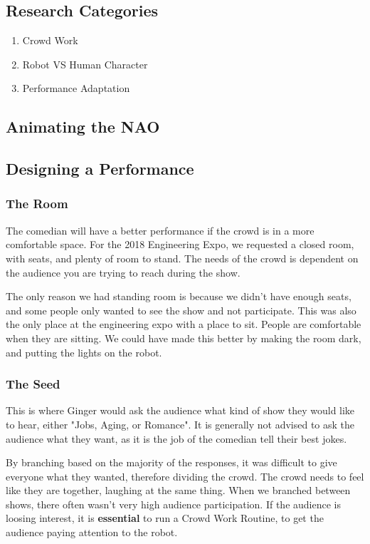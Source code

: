 \documentclass[onecolumn, draftclsnofoot,10pt, compsoc]{IEEEtran}
\begin{document}
\subsection{Research Categories}

		\begin{enumerate}
			\item Crowd Work
			\item Robot VS Human Character
			\item Performance Adaptation
		\end{enumerate}

\subsection{Animating the NAO}
\subsection{Designing a Performance}
    
    \subsubsection{The Room}
    The comedian will have a better performance if the crowd is in a more comfortable space.
    For the 2018 Engineering Expo, we requested a closed room, with seats, and plenty of room to stand.
    The needs of the crowd is dependent on the audience you are trying to reach during the show.


    The only reason we had standing room is because we didn't have enough seats, and some people only wanted to see the show and not participate.
    This was also the only place at the engineering expo with a place to sit.
    People are comfortable when they are sitting.
    We could have made this better by making the room dark, and putting the lights on the robot.
    \subsubsection{The Seed}
    This is where Ginger would ask the audience what kind of show they would like to hear, either "Jobs, Aging, or Romance".
    It is generally not advised to ask the audience what they want, as it is the job of the comedian tell their best jokes.


    By branching based on the majority of the responses, it was difficult to give everyone what they wanted, therefore dividing the crowd.
    The crowd needs to feel like they are together, laughing at the same thing.
    When we branched between shows, there often wasn't very high audience participation. 
    If the audience is loosing interest, it is \textbf{essential} to run a Crowd Work Routine, to get the audience paying attention to the robot.
\end{document}
